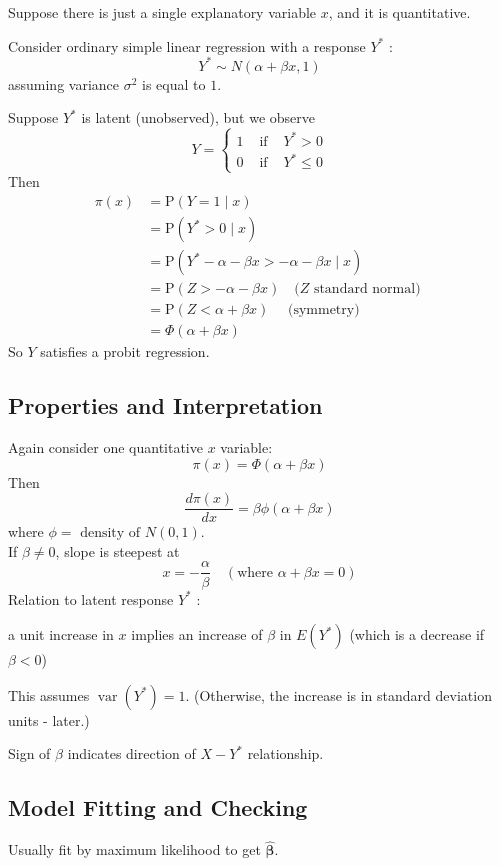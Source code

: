 \documentclass[11pt]{elegantbook}
\begin{document}
Suppose there is just a single explanatory variable $x$, and it is quantitative.

Consider ordinary simple linear regression with a response $Y^*$ :
$$
Y^* \sim N(\alpha+\beta x, 1)
$$
assuming variance $\sigma^2$ is equal to $1$.

Suppose $Y^*$ is latent (unobserved), but we observe
$$
Y=\left\{\begin{array}{lll}
1 & \text { if } & Y^*>0 \\
0 & \text { if } & Y^* \leq 0
\end{array}\right.
$$
Then
$$
\begin{aligned}
\pi(x) & =\mathrm{P}(Y=1 \mid x) \\
& =\mathrm{P}\left(Y^*>0 \mid x\right) \\
& =\mathrm{P}\left(Y^*-\alpha-\beta x>-\alpha-\beta x \mid x\right) \\
& =\mathrm{P}(Z>-\alpha-\beta x) \quad(Z \text { standard normal) } \\
& =\mathrm{P}(Z<\alpha+\beta x) \quad \text { (symmetry) } \\
& =\Phi(\alpha+\beta x)
\end{aligned}
$$
So $Y$ satisfies a probit regression.

\subsection{Properties and Interpretation}
Again consider one quantitative $x$ variable:
$$
\pi(x)=\Phi(\alpha+\beta x)
$$
Then
$$
\frac{d \pi(x)}{d x}=\beta \phi(\alpha+\beta x)
$$
where $\phi=\text { density of } N(0,1)$.\\
If $\beta \neq 0$, slope is steepest at
$$
x=-\frac{\alpha}{\beta} \quad(\text {where } \alpha+\beta x=0)
$$
Relation to latent response $Y^*$ :
\begin{center}
    a unit increase in $x$ implies an increase of $\beta$ in $E\left(Y^*\right)$
(which is a decrease if $\beta<0$)
\end{center}
This assumes $\operatorname{var}\left(Y^*\right)=1$. (Otherwise, the increase is in standard deviation units - later.)

Sign of $\beta$ indicates direction of $X-Y^*$ relationship.

\subsection{Model Fitting and Checking}
Usually fit by maximum likelihood to get $\hat{\boldsymbol{\beta}}$.
\end{document}
